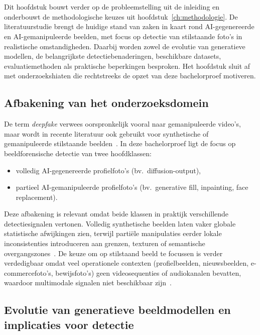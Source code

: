 \chapter{}%
\label{ch:stand-van-zaken}

Dit hoofdstuk bouwt verder op de probleemstelling uit de inleiding en onderbouwt de methodologische keuzes uit hoofdstuk~\ref{ch:methodologie}. De literatuurstudie brengt de huidige stand van zaken in kaart rond AI-gegenereerde en AI-gemanipuleerde beelden, met focus op detectie van stilstaande foto's in realistische omstandigheden. Daarbij worden zowel de evolutie van generatieve modellen, de belangrijkste detectiebenaderingen, beschikbare datasets, evaluatiemethoden als praktische beperkingen besproken. Het hoofdstuk sluit af met onderzoekshiaten die rechtstreeks de opzet van deze bachelorproef motiveren.

\section{Afbakening van het onderzoeksdomein}
De term \emph{deepfake} verwees oorspronkelijk vooral naar gemanipuleerde video's, maar wordt in recente literatuur ook gebruikt voor synthetische of gemanipuleerde stilstaande beelden~\autocite{MultimodalSurvey2025,Pei2024}. In deze bachelorproef ligt de focus op beeldforensische detectie van twee hoofdklassen:
\begin{itemize}
  \item volledig AI-gegenereerde profielfoto's (bv.~diffusion-output),
  \item partieel AI-gemanipuleerde profielfoto's (bv.~generative fill, inpainting, face replacement).
\end{itemize}

Deze afbakening is relevant omdat beide klassen in praktijk verschillende detectiesignalen vertonen. Volledig synthetische beelden laten vaker globale statistische afwijkingen zien, terwijl partiële manipulaties eerder lokale inconsistenties introduceren aan grenzen, texturen of semantische overgangszones~\autocite{WangDIRE2023,SIDA2025}. De keuze om op stilstaand beeld te focussen is verder verdedigbaar omdat veel operationele contexten (profielbeelden, nieuwsbeelden, e-commercefoto's, bewijsfoto's) geen videosequenties of audiokanalen bevatten, waardoor multimodale signalen niet beschikbaar zijn~\autocite{MultimodalSurvey2025}.

\section{Evolutie van generatieve beeldmodellen en implicaties voor detectie}

